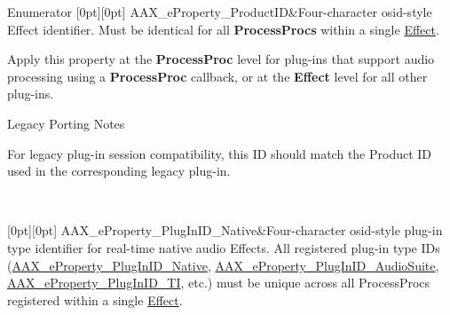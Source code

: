 \begin{DoxyEnumFields}{Enumerator}
[0pt][0pt]{}\mbox{\label{a00662_a13e384f22825afd3db6d68395b79ce0da3a41fcdff5af1a4fd19dcbca7b1ba6f3}} 
A\+A\+X\+\_\+e\+Property\+\_\+\+Product\+ID&Four-\/character osid-\/style Effect identifier. Must be identical for all {\bfseries{Process\+Procs}} within a single \mbox{\hyperlink{a01813}{Effect}}.

\begin{DoxyItemize}
\item Apply this property at the {\bfseries{Process\+Proc}} level for plug-\/ins that support audio processing using a {\bfseries{Process\+Proc}} callback, or at the {\bfseries{Effect}} level for all other plug-\/ins.\end{DoxyItemize}
\begin{DoxyRefDesc}{Legacy Porting Notes}
\item[\mbox{\hyperlink{a00787__porting_notes000042}{Legacy Porting Notes}}]For legacy plug-\/in session compatibility, this ID should match the Product ID used in the corresponding legacy plug-\/in. \end{DoxyRefDesc}
\\
\hline

[0pt][0pt]{}\mbox{\label{a00662_a13e384f22825afd3db6d68395b79ce0da89ca3dd6e96895cda14976c1b1ceb826}} 
A\+A\+X\+\_\+e\+Property\+\_\+\+Plug\+In\+I\+D\+\_\+\+Native&Four-\/character osid-\/style plug-\/in type identifier for real-\/time native audio Effects. All registered plug-\/in type I\+Ds (\mbox{\hyperlink{a00662_a13e384f22825afd3db6d68395b79ce0da89ca3dd6e96895cda14976c1b1ceb826}{A\+A\+X\+\_\+e\+Property\+\_\+\+Plug\+In\+I\+D\+\_\+\+Native}}, \mbox{\hyperlink{a00662_a13e384f22825afd3db6d68395b79ce0dad3344696b8298a8b254add3d039ea927}{A\+A\+X\+\_\+e\+Property\+\_\+\+Plug\+In\+I\+D\+\_\+\+Audio\+Suite}}, \mbox{\hyperlink{a00662_a13e384f22825afd3db6d68395b79ce0da75f174df4efbeca86eaada126c1d9214}{A\+A\+X\+\_\+e\+Property\+\_\+\+Plug\+In\+I\+D\+\_\+\+TI}}, etc.) must be unique across all Process\+Procs registered within a single \mbox{\hyperlink{a01813}{Effect}}.


\end{DoxyEnumFields}
